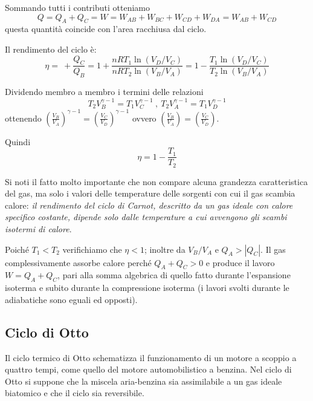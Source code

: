 \documentclass[class=book, crop=false, oneside, 12pt]{standalone}
\begin{document}
Sommando tutti i contributi otteniamo
\begin{equation*}
    Q = Q_A + Q_C = W = W_{AB} + W_{BC} + W_{CD} + W_{DA} = W_{AB} + W_{CD}
\end{equation*}
questa quantità coincide con l'area racchiusa dal ciclo.

Il rendimento del ciclo è:
\begin{equation*}
    \eta = \ + \frac{Q_C}{Q_B} = 1 + \frac{n R T_1 \ln \left(V_D / V_C \right) }{n R T_2 \ln \left(V_B / V_A \right)} = 1 - \frac{T_1 \ln \left(V_D / V_C \right) }{T_2 \ln \left(V_B / V_A \right)}
\end{equation*}

Dividendo membro a membro i termini delle relazioni
\begin{equation*}
    T_2 V_B^{\gamma - 1} = T_1 V_C^{\gamma - 1} \ , \ T_2 V_A^{\gamma - 1} = T_1 V_D^{\gamma - 1} 
\end{equation*}
ottenendo \(\left(\frac{V_B}{V_A}\right)^{\gamma - 1} = \left(\frac{V_C}{V_D}\right)^{\gamma - 1}\) ovvero \(\left(\frac{V_B}{V_A}\right) = \left(\frac{V_C}{V_D}\right)\).

Quindi
\begin{equation}
    \eta = 1 - \frac{T_1}{T_2}
\end{equation}

Si noti il fatto molto importante che non compare alcuna grandezza caratteristica del gas, ma solo i valori delle temperature delle sorgenti con cui il gas scambia calore: 
\emph{il rendimento del ciclo di Carnot, descritto da un gas ideale con calore specifico costante, dipende solo dalle temperature a cui avvengono gli scambi isotermi di calore}.

Poiché \(T_1 < T_2\) verifichiamo che \(\eta<1\); inoltre da \(V_B / V_A\) e \(Q_A > | Q_C | \). 
Il gas complessivamente assorbe calore perché \(Q_A + Q_C > 0\) e produce il lavoro \(W = Q_A + Q_C\), pari alla somma algebrica di quello fatto durante l'espansione isoterma e subito durante la compressione isoterma (i lavori svolti durante le adiabatiche sono eguali ed opposti). 

\subsection{Ciclo di Otto}

Il ciclo termico di Otto schematizza il funzionamento di un motore a scoppio a quattro tempi, come quello del motore automobilistico a benzina. 
Nel ciclo di Otto si suppone che la miscela aria-benzina sia assimilabile a un gas ideale biatomico e che il ciclo sia reversibile. 
\end{document}

